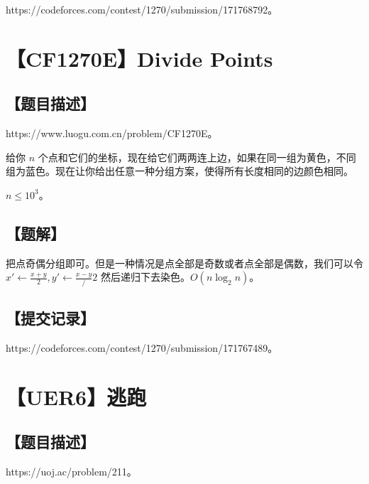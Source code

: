 \documentclass[UTF8,12pt,a4paper]{ctexart}
\begin{document}
	https://codeforces.com/contest/1270/submission/171768792。
	
	
	\section*{【CF1270E】Divide Points}
	
	\subsection*{【题目描述】}
	
	https://www.luogu.com.cn/problem/CF1270E。
	
	给你 $n$ 个点和它们的坐标，现在给它们两两连上边，如果在同一组为黄色，不同组为蓝色。现在让你给出任意一种分组方案，使得所有长度相同的边颜色相同。
	
	$n\le 10^3$。
	
	\subsection*{【题解】}
	
	把点奇偶分组即可。但是一种情况是点全部是奇数或者点全部是偶数，我们可以令 $x'\leftarrow \frac{x+y}2,y'\leftarrow \frac{x-y}/2$ 然后递归下去染色。$O(n\log_2n)$。
	
	\subsection*{【提交记录】}
	
	https://codeforces.com/contest/1270/submission/171767489。
	
	
	\section*{【UER6】逃跑}
	
	\subsection*{【题目描述】}
	
	https://uoj.ac/problem/211。
	
\end{document}
